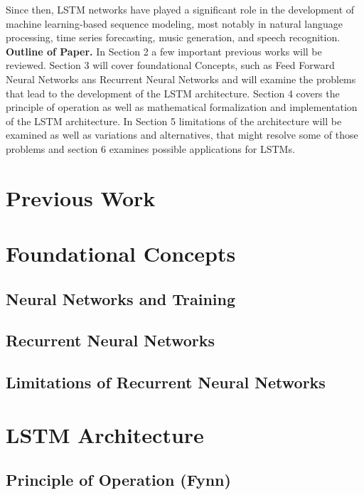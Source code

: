 \documentclass[twoside,a4paper,10pt,DIV=12,BCOR=12mm]{scrartcl}
\begin{document}
Since then, LSTM networks have played a significant role in the development of machine learning-based sequence modeling, most notably in natural language processing, time series forecasting, music generation, and speech recognition.\cite{eck2002musicgeneration,torres2022elctricityforecasting,gers2001timeseries,nielsen2024electricitypriceforcasting, gers2000lstmnlp}\\
\textbf{Outline of Paper.} In Section 2 a few important previous works will be reviewed. Section 3 will cover foundational Concepts, such as Feed Forward Neural Networks ans Recurrent Neural Networks and will examine the problems that lead to the development of the LSTM architecture. Section 4 covers the principle of operation as well as mathematical formalization and implementation of the LSTM architecture.  In Section 5 limitations of the architecture will be examined as well as variations and alternatives, that might resolve some of those problems and section 6 examines possible applications for LSTMs.\\

\section{Previous Work}

\section{Foundational Concepts}

\subsection{Neural Networks and Training}

\subsection{Recurrent Neural Networks}

\subsection{Limitations of Recurrent Neural Networks}

\section{LSTM Architecture}
\subsection{Principle of Operation (Fynn)}
\end{document}

